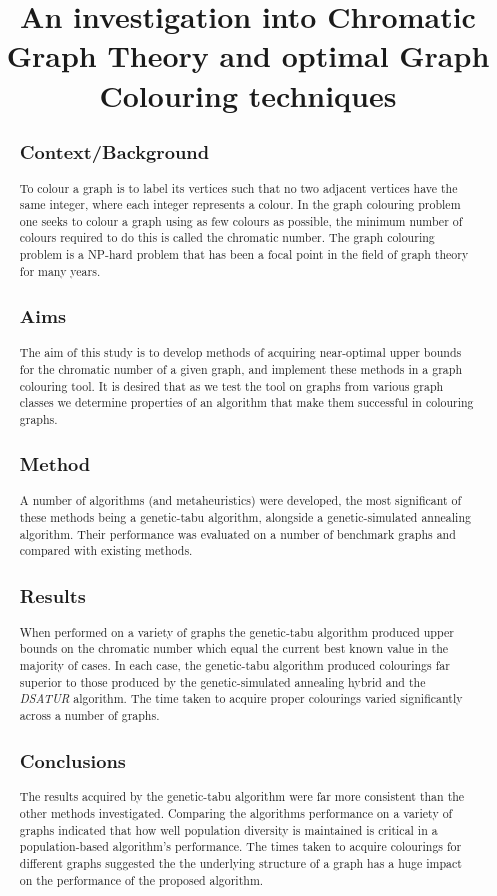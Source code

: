 \documentclass[12pt,a4paper]{article}
\title{An investigation into Chromatic Graph Theory and optimal Graph Colouring techniques}
\author{} %
\date{}
\begin{document}
\maketitle

\begin{abstract}

\subsection*{Context/Background}
\noindent
To colour a graph is to label its vertices such that no two adjacent vertices have the same integer, where each integer represents a colour. In the graph colouring problem one seeks to colour a graph using as few colours as possible, the minimum number of colours required to do this is called the chromatic number. The graph colouring problem is a NP-hard problem that has been a focal point in the field of graph theory for many years.
\subsection*{Aims}
\noindent
The aim of this study is to develop methods of acquiring near-optimal upper bounds for the chromatic number of a given graph, and implement these methods in a graph colouring tool. It is desired that as we test the tool on graphs from various graph classes we determine properties of an algorithm that make them successful in colouring graphs.
\subsection*{Method}
\noindent
A number of algorithms (and metaheuristics) were developed, the most significant of these methods being a genetic-tabu algorithm, alongside a genetic-simulated annealing algorithm. Their performance was evaluated on a number of benchmark graphs and compared with existing methods. 
\subsection*{Results}
\noindent
When performed on a variety of graphs the genetic-tabu algorithm produced upper bounds on the chromatic number which equal the current best known value in the majority of cases. In each case, the genetic-tabu algorithm produced colourings far superior to those produced by the genetic-simulated annealing hybrid and the \textit{DSATUR} algorithm. The time taken to acquire proper colourings varied significantly across a number of graphs.
\subsection*{Conclusions}
\noindent
The results acquired by the genetic-tabu algorithm were far more consistent than the other methods investigated. Comparing the algorithms performance on a variety of graphs indicated that how well population diversity is maintained is critical in a population-based algorithm's performance. The times taken to acquire colourings for different graphs suggested the the underlying structure of a graph has a huge impact on the performance of the proposed algorithm.
\end{abstract}
\end{document}
